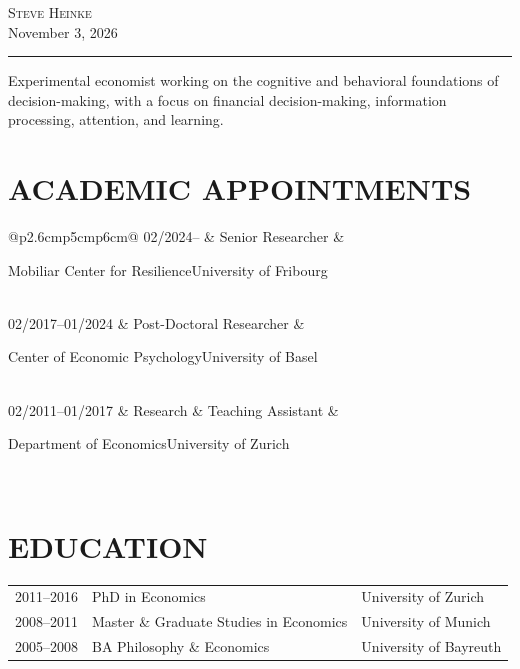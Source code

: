 \documentclass[10pt]{article}
\newcommand{\apptentry}[4]{%
  #1 & #2 & \parbox[t]{\linewidth}{#3\newline#4} \\[3pt]
}
\begin{document}
\thispagestyle{fancy}

\begin{center}
  {\Large \scshape Steve Heinke}\\[2pt]
  November 3, 2026
\end{center}

\vspace{2pt}
\hrule
\vspace{5pt}

\begin{center}
\parbox{0.85\textwidth}{\centering
Experimental economist working on the cognitive and behavioral foundations of decision-making, with a focus
on financial decision-making, information processing, attention, and learning.
}
\end{center}

\section*{ACADEMIC APPOINTMENTS}
\begin{tabular}{@{}p{2.6cm}p{5cm}p{6cm}@{}}
\apptentry{02/2024--}{Senior Researcher}{Mobiliar Center for Resilience}{University of Fribourg}
\apptentry{02/2017--01/2024}{Post-Doctoral Researcher}{Center of Economic Psychology}{University of Basel}
\apptentry{02/2011--01/2017}{Research \& Teaching Assistant}{Department of Economics}{University of Zurich}
\end{tabular}

\section*{EDUCATION}
\begin{tabular}{@{}p{2.6cm}p{7.5cm}p{4cm}@{}}
2011--2016 & PhD in Economics & University of Zurich \\[2pt]
2008--2011 & Master \& Graduate Studies in Economics & University of Munich \\[2pt]
2005--2008 & BA Philosophy \& Economics & University of Bayreuth \\
\end{tabular}
\end{document}
